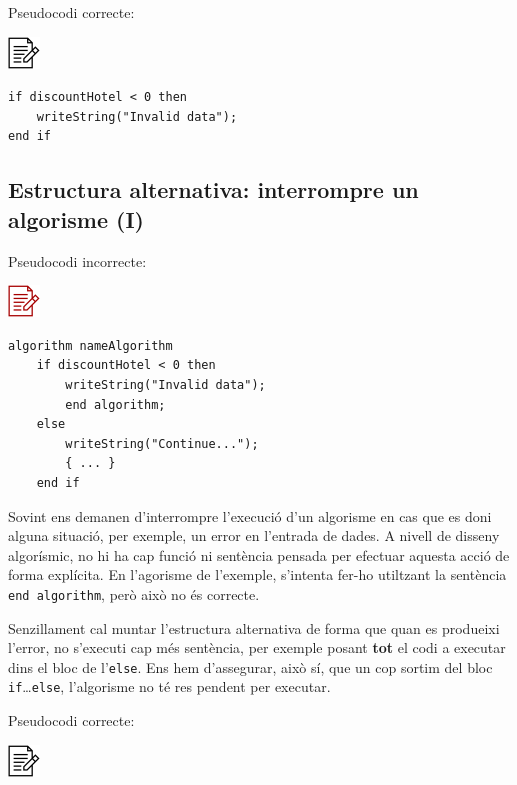 \documentclass[
]{book}
\begin{document}
Pseudocodi correcte:

\includegraphics{./img/alg.png}

\begin{verbatim}
if discountHotel < 0 then
    writeString("Invalid data");
end if
\end{verbatim}

\hypertarget{estructura-alternativa-interrompre-un-algorisme-i}{%
\subsection{Estructura alternativa: interrompre un algorisme (I)}\label{estructura-alternativa-interrompre-un-algorisme-i}}

Pseudocodi incorrecte:

\includegraphics{./img/alg_err.png}

\begin{verbatim}
algorithm nameAlgorithm
    if discountHotel < 0 then
        writeString("Invalid data");
        end algorithm;
    else
        writeString("Continue...");
        { ... }
    end if
\end{verbatim}

Sovint ens demanen d'interrompre l'execució d'un algorisme en cas que es doni alguna situació, per exemple, un error en l'entrada de dades. A nivell de disseny algorísmic, no hi ha cap funció ni sentència pensada per efectuar aquesta acció de forma explícita. En l'agorisme de l'exemple, s'intenta fer-ho utiltzant la sentència \texttt{end\ algorithm}, però això no és correcte.

Senzillament cal muntar l'estructura alternativa de forma que quan es produeixi l'error, no s'executi cap més sentència, per exemple posant \textbf{tot} el codi a executar dins el bloc de l'\texttt{else}. Ens hem d'assegurar, això sí, que un cop sortim del bloc \texttt{if}\ldots{}\texttt{else}, l'algorisme no té res pendent per executar.

Pseudocodi correcte:

\includegraphics{./img/alg.png}
\end{document}
